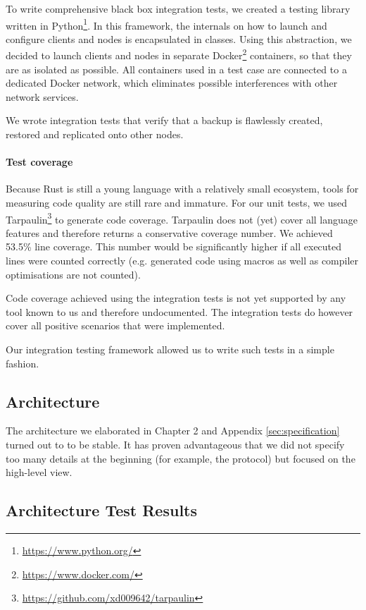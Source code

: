 To write comprehensive black box integration tests, we created a testing library written in Python\footnote{\url{https://www.python.org/}}. In this framework, the internals on how to launch and configure \glspl{client} and \glspl{node} is encapsulated in classes. Using this abstraction, we decided to launch \glspl{client} and \glspl{node} in separate Docker\footnote{\url{https://www.docker.com/}} containers, so that they are as isolated as possible. All containers used in a test case are connected to a dedicated Docker network, which eliminates possible interferences with other network services.

We wrote integration tests that verify that a backup is flawlessly created, restored and replicated onto other \glspl{node}.

\paragraph{Test coverage}

Because Rust is still a young language with a relatively small ecosystem, tools for measuring code quality are still rare and immature. For our unit tests, we used Tarpaulin\footnote{\url{https://github.com/xd009642/tarpaulin}} to generate code coverage. Tarpaulin does not (yet) cover all language features and therefore returns a conservative coverage number. We achieved 53.5\% line coverage. This number would be significantly higher if all executed lines were counted correctly  (e.g. generated code using macros as well as compiler optimisations are not counted).

Code coverage achieved using the integration tests is not yet supported by any tool known to us and therefore undocumented. The integration tests do however cover all positive scenarios that were implemented.

Our integration testing framework allowed us to write such tests in a simple fashion.

\subsection{Architecture}

The architecture we elaborated in Chapter 2 and Appendix \ref{sec:specification} turned out to to be stable. It has proven advantageous that we did not specify too many details at the beginning (for example, the protocol) but focused on the high-level view.

\subsection{Architecture Test Results}

